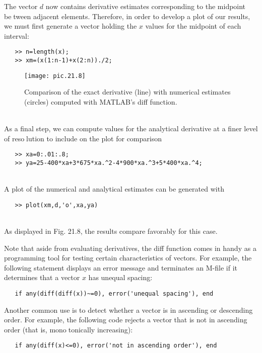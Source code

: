 The vector $d$ now contains derivative estimates corresponding to the midpoint between adjacent elements. Therefore, in order to develop a plot of our results, we must first
generate a vector holding the $x$ values for the midpoint of each interval:

\begin{verbatim}
   >> n=length(x);
   >> xm=(x(1:n-1)+x(2:n))./2;
\end{verbatim}
\pagebreak
\begin{figure}[hbt!]
	\centering
	\texttt{[image: pic.21.8]}
	\caption{\textsf{Comparison of the exact derivative (line) with numerical estimates (circles) computed with
MATLAB’s diff function.}} \vspace{0.1in} \hline
	\label{pic.21.8}
\end{figure}\\
As a final step, we can compute values for the analytical derivative at a finer level of resolution to include on the plot for comparison

\begin{verbatim}
   >> xa=0:.01:.8;
   >> ya=25-400*xa+3*675*xa.^2-4*900*xa.^3+5*400*xa.^4;
\end{verbatim}\\
A plot of the numerical and analytical estimates can be generated with
\begin{verbatim}
   >> plot(xm,d,'o',xa,ya)
\end{verbatim}\\
As displayed in Fig. 21.8, the results compare favorably for this case.
\vspace{0.4in}

Note that aside from evaluating derivatives, the diff function comes in handy as a
programming tool for testing certain characteristics of vectors. For example, the following
statement displays an error message and terminates an M-file if it determines that a vector
$x$ has unequal spacing:
\begin{verbatim}
   if any(diff(diff(x))~=0), error('unequal spacing'), end
\end{verbatim}

Another common use is to detect whether a vector is in ascending or descending order.
For example, the following code rejects a vector that is not in ascending order (that is, monotonically increasing):
\begin{verbatim}
   if any(diff(x)<=0), error('not in ascending order'), end
\end{verbatim}

